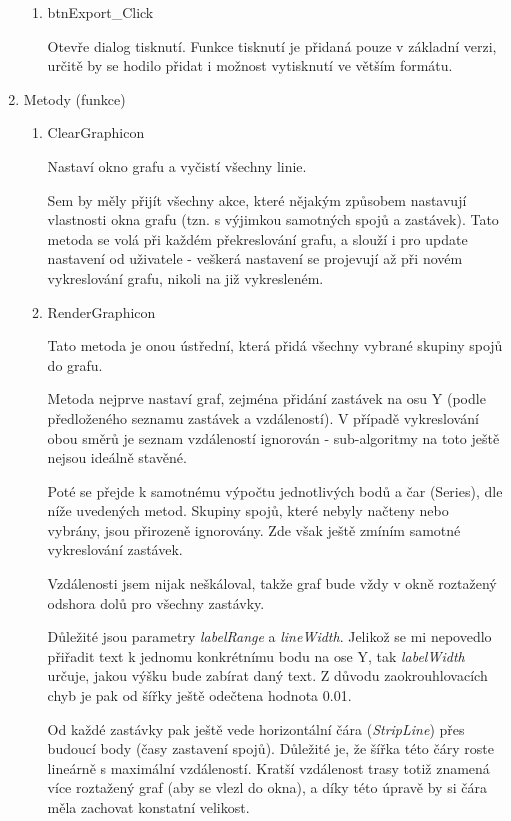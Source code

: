 \documentclass[14pt]{article}
\begin{document}
\begin{enumerate}
\begin{enumerate}
\item btnExport\_Click

Otevře dialog tisknutí. Funkce tisknutí je přidaná pouze v základní verzi, určitě by se hodilo přidat i možnost vytisknutí ve  větším formátu.

\end{enumerate}

\item Metody (funkce)

\begin{enumerate}

\item ClearGraphicon

Nastaví okno grafu a vyčistí všechny linie.

Sem by měly přijít všechny akce, které nějakým způsobem nastavují vlastnosti okna grafu (tzn. s výjimkou samotných spojů a zastávek). Tato metoda se volá při každém překreslování grafu, a slouží i pro update nastavení od uživatele - veškerá nastavení se projevují až při novém vykreslování grafu, nikoli na již vykresleném.

\item RenderGraphicon

Tato metoda je onou ústřední, která přidá všechny vybrané skupiny spojů do grafu.

Metoda nejprve nastaví graf, zejména přidání zastávek na osu Y (podle předloženého seznamu zastávek a vzdáleností). V případě vykreslování obou směrů je seznam vzdáleností ignorován - sub-algoritmy na toto ještě nejsou ideálně stavěné.

Poté se přejde k samotnému výpočtu jednotlivých bodů a čar (Series), dle níže uvedených metod. Skupiny spojů, které nebyly načteny nebo vybrány, jsou přirozeně ignorovány. Zde však ještě zmíním samotné vykreslování zastávek.

Vzdálenosti jsem nijak neškáloval, takže graf bude vždy v okně roztažený odshora dolů pro všechny zastávky.

Důležité jsou parametry \textit{labelRange} a \textit{lineWidth}. Jelikož se mi nepovedlo přiřadit text k jednomu konkrétnímu bodu na ose Y, tak \textit{labelWidth} určuje, jakou výšku bude zabírat daný text. Z důvodu zaokrouhlovacích chyb je pak od šířky ještě odečtena hodnota 0.01.

Od každé zastávky pak ještě vede horizontální čára (\textit{StripLine}) přes budoucí body (časy zastavení spojů). Důležité je, že šířka této čáry roste lineárně s maximální vzdáleností. Kratší vzdálenost trasy totiž znamená více roztažený graf (aby se vlezl do okna), a díky této úpravě by si čára měla zachovat konstatní velikost.


\end{enumerate}
\end{enumerate}
\end{document}
